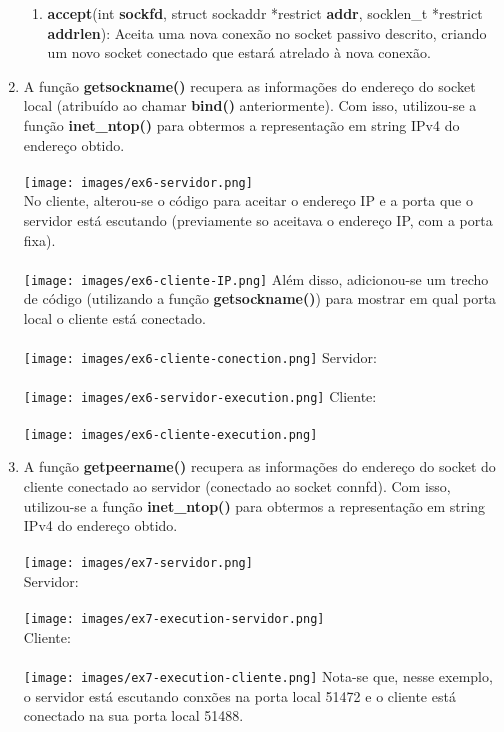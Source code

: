\documentclass[12pt,a4paper]{report}
\begin{document}
\begin{enumerate}
\begin{enumerate}
        \item \textbf{accept}(int \textbf{sockfd}, struct sockaddr *restrict \textbf{addr}, socklen\_t *restrict \textbf{addrlen}): Aceita uma nova conexão no socket passivo descrito, criando um novo socket conectado que estará atrelado à nova conexão.
    \end{enumerate}
    
    \item A função \textbf{getsockname()} recupera as informações do endereço do socket local (atribuído ao chamar \textbf{bind()} anteriormente). Com isso, utilizou-se a função \textbf{inet\_ntop()} para obtermos a representação em string IPv4 do endereço obtido.
    \\\\ 
    \texttt{[image: images/ex6-servidor.png]}
    \\
    No cliente, alterou-se o código para aceitar o endereço IP e a porta que o servidor está escutando (previamente so aceitava o endereço IP, com a porta fixa). 
    \\\\
    \texttt{[image: images/ex6-cliente-IP.png]}
    Além disso, adicionou-se um trecho de código (utilizando a função \textbf{getsockname()}) para mostrar em qual porta local o cliente está conectado.
    \\\\
    \texttt{[image: images/ex6-cliente-conection.png]}
    Servidor:\\\\ 
    \texttt{[image: images/ex6-servidor-execution.png]}
    Cliente:\\\\
    \texttt{[image: images/ex6-cliente-execution.png]}

    \item A função \textbf{getpeername()} recupera as informações do endereço do socket do cliente conectado ao servidor (conectado ao socket connfd). Com isso, utilizou-se a função \textbf{inet\_ntop()} para obtermos a representação em string IPv4 do endereço obtido.
    \\\\
    \texttt{[image: images/ex7-servidor.png]}\\
    Servidor:\\\\
    \texttt{[image: images/ex7-execution-servidor.png]}\\
    Cliente:\\\\
    \texttt{[image: images/ex7-execution-cliente.png]}
    Nota-se que, nesse exemplo, o servidor está escutando conxões na porta local 51472 e o cliente está conectado na sua porta local 51488.
    

\end{enumerate}
\end{document}
